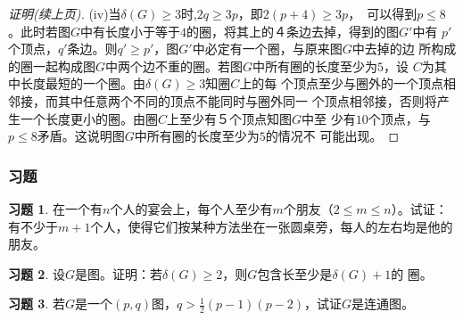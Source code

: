 \documentclass{beamer}
\theoremstyle{definition}
\theoremstyle{example}
\begin{document}
\begin{CJK*}{UTF8}{gbsn}
\begin{frame}
\begin{proof}[证明(续上页)]
    (iv)当$\delta(G)\geq 3$时,$2q\geq 3p$，即$2(p+4) \geq 3p$，　可以得到$p \leq
    8$。此时若图$G$中有长度小于等于$4$的圈，将其上的４条边去掉，得到的图$G'$中有
    $p'$个顶点，$q'$条边。则$q'\geq p'$，图$G'$中必定有一个圈，与原来图$G$中去掉的边
    所构成的圈一起构成图$G$中两个边不重的圈。若图$G$中所有圈的长度至少为$5$，设
    $C$为其中长度最短的一个圈。由$\delta(G)\geq 3$知圈$C$上的每
    个顶点至少与圈外的一个顶点相邻接，而其中任意两个不同的顶点不能同时与圈外同一
    个顶点相邻接，否则将产生一个长度更小的圈。由圈$C$上至少有５个顶点知图$G$中至
    少有$10$个顶点，与$p \leq 8$矛盾。这说明图$G$中所有圈的长度至少为$5$的情况不
    可能出现。
  \end{proof}

\end{frame}
\newtheorem{Exercise}{习题}

\begin{frame}
  \frametitle{习题}
  \begin{Exercise}
    在一个有$n$个人的宴会上，每个人至少有$m$个朋友（$2 \leq m \leq n$）。试证：
    有不少于$m+1$个人，使得它们按某种方法坐在一张圆桌旁，每人的左右均是他的朋友。
  \end{Exercise}
  \begin{Exercise}
    设$G$是图。证明：若$\delta (G) \geq 2$，则$G$包含长至少是$\delta (G) + 1$的
    圈。
  \end{Exercise}
  \begin{Exercise}
      若$G$是一个$(p,q)$图，$q > \frac{1}{2}(p-1)(p-2)$，试证$G$是连通图。  
  \end{Exercise}
\end{frame}



\end{CJK*}
\end{document}
